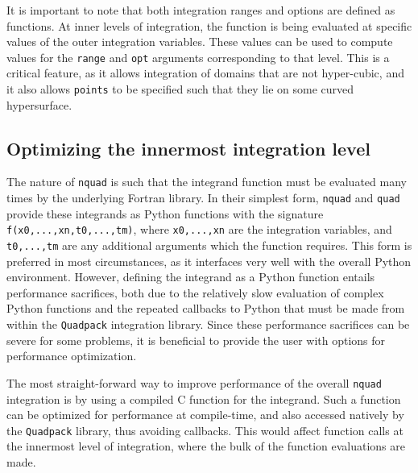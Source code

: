 It is important to note that both integration ranges and options are defined as functions. At inner levels of integration, the function is being evaluated at specific values of the outer integration variables. These values can be used to compute values for the {\tt range} and {\tt opt} arguments corresponding to that level. This is a critical feature, as it allows integration of domains that are not hyper-cubic, and it also allows {\tt points} to be specified such that they lie on some curved hypersurface. 

\subsection{Optimizing the innermost integration level}

The nature of {\tt nquad} is such that the integrand function must be evaluated many times by the underlying Fortran library. In their simplest form, {\tt nquad} and {\tt quad} provide these integrands as Python functions with the signature {\tt f(x0,...,xn,t0,...,tm)}, where {\tt x0,...,xn} are the integration variables, and {\tt t0,...,tm} are any additional arguments which the function requires. This form is preferred in most circumstances, as it interfaces very well with the overall Python environment. However, defining the integrand as a Python function entails performance sacrifices, both due to the relatively slow evaluation of complex Python functions and the repeated callbacks to Python that must be made from within the {\tt Quadpack} integration library. Since these performance sacrifices can be severe for some problems, it is beneficial to provide the user with options for performance optimization.

The most straight-forward way to improve performance of the overall {\tt nquad} integration is by using a compiled C function for the integrand. Such a function can be optimized for performance at compile-time, and also accessed natively by the {\tt Quadpack} library, thus avoiding callbacks. This would affect function calls at the innermost level of integration, where the bulk of the function evaluations are made. 

